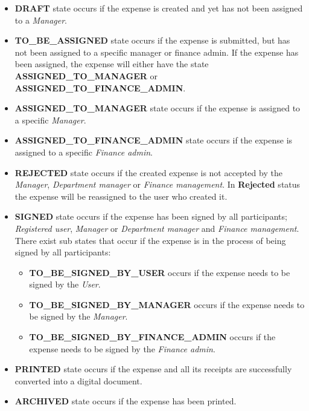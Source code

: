 \begin{itemize}
    \item \textbf{DRAFT} state occurs if the expense is created and yet has not been assigned to a \textit{Manager}.
    
    \item \textbf{TO\_BE\_ASSIGNED} state occurs if the expense is submitted, but has not been assigned to a specific manager or finance admin. If the expense has been assigned, the expense will either have the state \textbf{ASSIGNED\_TO\_MANAGER} or \textbf{ASSIGNED\_TO\_FINANCE\_ADMIN}.
    
    \item \textbf{ASSIGNED\_TO\_MANAGER} state occurs if the expense is assigned to a specific \textit{Manager}.
    
    \item \textbf{ASSIGNED\_TO\_FINANCE\_ADMIN} state occurs if the expense is assigned to a specific \textit{Finance admin}.
    
    \item \textbf{REJECTED} state occurs if the created expense is not accepted by the \textit{Manager}, \textit{Department manager} or \textit{Finance management}. In \textbf{Rejected} status the expense will be reassigned to the user who created it.
    
    \item \textbf{SIGNED} state occurs if the expense has been signed by all participants; \textit{Registered user}, \textit{Manager} or \textit{Department manager} and \textit{Finance management}. There exist sub states that occur if the expense is in the process of being signed by all participants:
        \begin{itemize}
            \item \textbf{TO\_BE\_SIGNED\_BY\_USER} occurs if the expense needs to be signed by the \textit{User}.
            \item \textbf{TO\_BE\_SIGNED\_BY\_MANAGER} occurs if the expense needs to be signed by the \textit{Manager}.
            \item \textbf{TO\_BE\_SIGNED\_BY\_FINANCE\_ADMIN} occurs if the expense needs to be signed by the \textit{Finance admin}.
        \end{itemize}
    
    \item \textbf{PRINTED} state occurs if the expense and all its receipts are successfully converted into a digital document.
    
    \item \textbf{ARCHIVED} state occurs if the expense has been printed.
    
\end{itemize}

